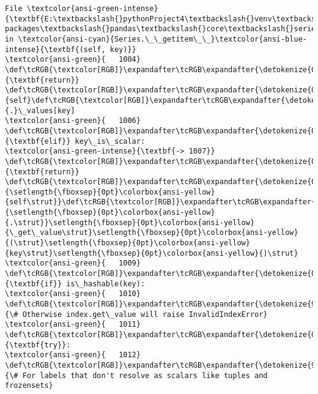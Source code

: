\documentclass[11pt]{ctexart}
\begin{document}
\begin{Verbatim}[commandchars=\\\{\}, frame=single, framerule=2mm, rulecolor=\color{outerrorbackground}]
File \textcolor{ansi-green-intense}{\textbf{E:\textbackslash{}pythonProject4\textbackslash{}venv\textbackslash{}lib\textbackslash{}site-packages\textbackslash{}pandas\textbackslash{}core\textbackslash{}series.py:1007}}, in \textcolor{ansi-cyan}{Series.\_\_getitem\_\_}\textcolor{ansi-blue-intense}{\textbf{(self, key)}}
\textcolor{ansi-green}{   1004}     \def\tcRGB{\textcolor[RGB]}\expandafter\tcRGB\expandafter{\detokenize{0,135,0}}{\textbf{return}} \def\tcRGB{\textcolor[RGB]}\expandafter\tcRGB\expandafter{\detokenize{0,135,0}}{self}\def\tcRGB{\textcolor[RGB]}\expandafter\tcRGB\expandafter{\detokenize{98,98,98}}{.}\_values[key]
\textcolor{ansi-green}{   1006} \def\tcRGB{\textcolor[RGB]}\expandafter\tcRGB\expandafter{\detokenize{0,135,0}}{\textbf{elif}} key\_is\_scalar:
\textcolor{ansi-green-intense}{\textbf{-> 1007}}     \def\tcRGB{\textcolor[RGB]}\expandafter\tcRGB\expandafter{\detokenize{0,135,0}}{\textbf{return}} \def\tcRGB{\textcolor[RGB]}\expandafter\tcRGB\expandafter{\detokenize{0,135,0}}{\setlength{\fboxsep}{0pt}\colorbox{ansi-yellow}{self\strut}}\def\tcRGB{\textcolor[RGB]}\expandafter\tcRGB\expandafter{\detokenize{98,98,98}}{\setlength{\fboxsep}{0pt}\colorbox{ansi-yellow}{.\strut}}\setlength{\fboxsep}{0pt}\colorbox{ansi-yellow}{\_get\_value\strut}\setlength{\fboxsep}{0pt}\colorbox{ansi-yellow}{(\strut}\setlength{\fboxsep}{0pt}\colorbox{ansi-yellow}{key\strut}\setlength{\fboxsep}{0pt}\colorbox{ansi-yellow}{)\strut}
\textcolor{ansi-green}{   1009} \def\tcRGB{\textcolor[RGB]}\expandafter\tcRGB\expandafter{\detokenize{0,135,0}}{\textbf{if}} is\_hashable(key):
\textcolor{ansi-green}{   1010}     \def\tcRGB{\textcolor[RGB]}\expandafter\tcRGB\expandafter{\detokenize{95,135,135}}{\# Otherwise index.get\_value will raise InvalidIndexError}
\textcolor{ansi-green}{   1011}     \def\tcRGB{\textcolor[RGB]}\expandafter\tcRGB\expandafter{\detokenize{0,135,0}}{\textbf{try}}:
\textcolor{ansi-green}{   1012}         \def\tcRGB{\textcolor[RGB]}\expandafter\tcRGB\expandafter{\detokenize{95,135,135}}{\# For labels that don't resolve as scalars like tuples and frozensets}


\end{Verbatim}
\end{document}
